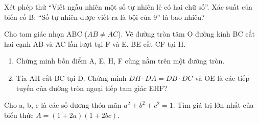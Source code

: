 \begin{ex}
	Xét phép thử “Viết ngẫu nhiên một số tự nhiên lẻ có hai chữ số”. Xác suất của biến cố B: “Số tự nhiên được viết ra là bội của 9” là bao nhiêu?
\end{ex}
\begin{ex}
	Cho tam giác nhọn ABC ($AB \neq AC$). Vẽ đường tròn tâm O đường kính BC cắt hai cạnh AB và AC lần lượt tại F và E. BE cắt CF tại H.
	\begin{enumerate}
		\item[a)] Chứng minh bốn điểm A, E, H, F cùng nằm trên một đường tròn.
		\item[b)] Tia AH cắt BC tại D. Chứng minh $DH \cdot DA = DB \cdot DC$ và OE là các tiếp tuyến của đường tròn ngoại tiếp tam giác EHF?
	\end{enumerate}
	\loigiai{
	\begin{center}
		

				
		
	\end{center}
	}
\end{ex}

\begin{ex}
	Cho a, b, c là các số dương thỏa mãn $a^2+b^2+c^2=1$. Tìm giá trị lớn nhất của biểu thức $A = (1+2a)(1+2bc)$.
\end{ex}


